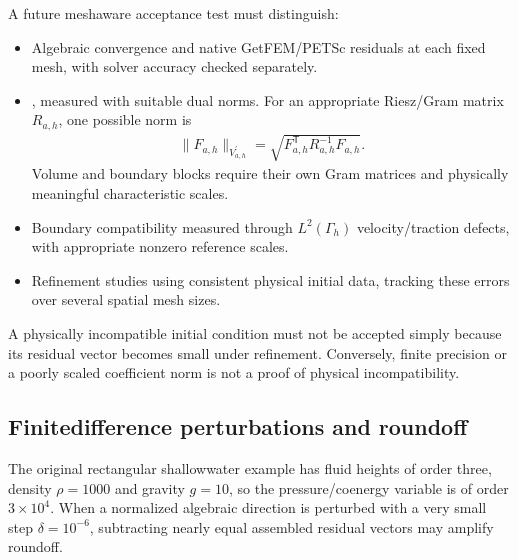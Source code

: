 \documentclass[letterpaper,10pt,english]{sphinxmanual}
\begin{document}
\sphinxAtStartPar
A future mesh\sphinxhyphen{}aware acceptance test must distinguish:
\begin{itemize}
\item {} 
\sphinxAtStartPar
Algebraic convergence and native GetFEM/PETSc residuals at
each fixed mesh, with solver accuracy checked separately.

\item {} 
\sphinxAtStartPar
{}, measured with
suitable dual norms. For an appropriate Riesz/Gram
matrix \(R_{a,h}\), one possible norm is
\begin{equation*}
\begin{split}\|F_{a,h}\|_{V_{a,h}^{\prime}}
  =\sqrt{F_{a,h}^{\mathsf T}R_{a,h}^{-1}F_{a,h}}.\end{split}
\end{equation*}
\sphinxAtStartPar
Volume and boundary blocks require their own Gram matrices
and physically meaningful characteristic scales.

\item {} 
\sphinxAtStartPar
Boundary compatibility measured through
\(L^2(\Gamma_h)\) velocity/traction defects, with
appropriate nonzero reference scales.

\item {} 
\sphinxAtStartPar
Refinement studies using consistent physical initial data,
tracking these errors over several spatial mesh sizes.

\end{itemize}

\sphinxAtStartPar
A physically incompatible  initial condition must
not be accepted simply because its residual vector becomes
small under refinement. Conversely, finite precision or
a poorly scaled coefficient norm is not a proof of physical
incompatibility.


\subsection{Finite\sphinxhyphen{}difference perturbations and roundoff}
\label{\detokenize{initialization:finite-difference-perturbations-and-roundoff}}
\sphinxAtStartPar
The original rectangular shallow\sphinxhyphen{}water example has
fluid heights of order three, density \(\rho=1000\)
and gravity \(g=10\), so the pressure/coenergy variable
is of order \(3\times10^4\). When a normalized
algebraic direction is perturbed with a very small
step \(\delta=10^{-6}\), subtracting nearly equal
assembled residual vectors may amplify roundoff.
\end{document}
